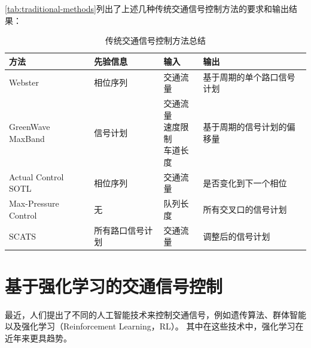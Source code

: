 \autoref{tab:traditional-methods}列出了上述几种传统交通信号控制方法的要求和输出结果：
\begin{table}[htb]
    \caption{传统交通信号控制方法总结\label{tab:traditional-methods}}
    \begin{tabular}{llll}
      \toprule
      方法 & 先验信息 & 输入 & 输出 \\
      \midrule
      Webster & 相位序列 & 交通流量 & 基于周期的单个路口信号计划 \\
      \hline
      \tabincell{l}{GreenWave\\MaxBand} & 信号计划 & \tabincell{l}{交通流量\\速度限制\\车道长度} & 基于周期的信号计划的偏移量 \\
      \hline
      \tabincell{l}{Actual Control\\SOTL} & 相位序列& 交通流量 & 是否变化到下一个相位\\
      \hline
      Max-Pressure Control & 无 & 队列长度 & 所有交叉口的信号计划\\
      \hline
      SCATS & 所有路口信号计划 & 交通流量 & 调整后的信号计划\\
      \bottomrule
    \end{tabular}
\end{table}

\section{基于强化学习的交通信号控制}
最近，人们提出了不同的人工智能技术来控制交通信号，例如遗传算法、群体智能以及强化学习（Reinforcement Learning，RL）。 其中在这些技术中，强化学习在近年来更具趋势。

